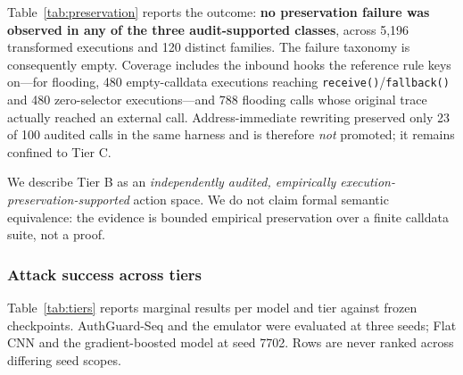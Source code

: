 \documentclass[conference]{IEEEtran}
\newcommand{\code}[1]{\texttt{#1}}
\begin{document}
Table~\ref{tab:preservation} reports the outcome: \textbf{no preservation failure was observed in any of the three audit-supported classes}, across 5,196 transformed executions and 120 distinct families. The failure taxonomy is consequently empty. Coverage includes the inbound hooks the reference rule keys on---for flooding, 480 empty-calldata executions reaching \code{receive()}/\code{fallback()} and 480 zero-selector executions---and 788 flooding calls whose original trace actually reached an external call. Address-immediate rewriting preserved only 23 of 100 audited calls in the same harness and is therefore \emph{not} promoted; it remains confined to Tier C.

We describe Tier B as an \emph{independently audited, empirically execution-preservation-supported} action space. We do not claim formal semantic equivalence: the evidence is bounded empirical preservation over a finite calldata suite, not a proof.

\subsubsection{Attack success across tiers}

Table~\ref{tab:tiers} reports marginal results per model and tier against frozen checkpoints. AuthGuard-Seq and the emulator were evaluated at three seeds; Flat CNN and the gradient-boosted model at seed 7702. Rows are never ranked across differing seed scopes.
\end{document}
